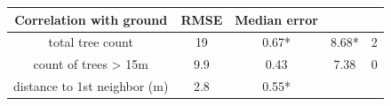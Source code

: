 \documentclass[]{article}
\begin{document}
\begin{longtable}[]{@{}ccccc@{}}
\begin{minipage}[b]{0.24\columnwidth}
Correlation with ground\strut
\end{minipage} & \begin{minipage}[b]{0.08\columnwidth}\centering\strut
RMSE\strut
\end{minipage} & \begin{minipage}[b]{0.13\columnwidth}\centering\strut
Median error\strut
\end{minipage}\tabularnewline
\midrule
\endhead
\begin{minipage}[t]{0.28\columnwidth}\centering\strut
total tree count\strut
\end{minipage} & \begin{minipage}[t]{0.13\columnwidth}\centering\strut
19\strut
\end{minipage} & \begin{minipage}[t]{0.24\columnwidth}\centering\strut
0.67*\strut
\end{minipage} & \begin{minipage}[t]{0.08\columnwidth}\centering\strut
8.68*\strut
\end{minipage} & \begin{minipage}[t]{0.13\columnwidth}\centering\strut
2\strut
\end{minipage}\tabularnewline
\begin{minipage}[t]{0.28\columnwidth}\centering\strut
count of trees \textgreater{} 15m\strut
\end{minipage} & \begin{minipage}[t]{0.13\columnwidth}\centering\strut
9.9\strut
\end{minipage} & \begin{minipage}[t]{0.24\columnwidth}\centering\strut
0.43\strut
\end{minipage} & \begin{minipage}[t]{0.08\columnwidth}\centering\strut
7.38\strut
\end{minipage} & \begin{minipage}[t]{0.13\columnwidth}\centering\strut
0\strut
\end{minipage}\tabularnewline
\begin{minipage}[t]{0.28\columnwidth}\centering\strut
distance to 1st neighbor (m)\strut
\end{minipage} & \begin{minipage}[t]{0.13\columnwidth}\centering\strut
2.8\strut
\end{minipage} & \begin{minipage}[t]{0.24\columnwidth}\centering\strut
0.55*\strut
\end{minipage} & \begin{minipage}[t]{0.08\columnwidth}\centering\strut

\end{minipage}
\end{longtable}
\end{document}
